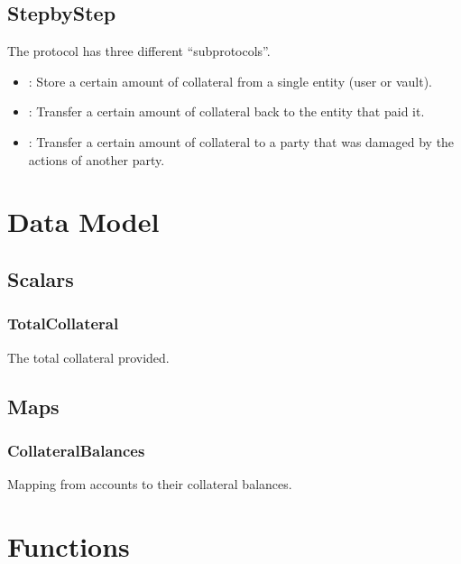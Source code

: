 \documentclass[a4paper,10pt,english]{sphinxmanual}
\begin{document}
\subsection{Step\sphinxhyphen{}by\sphinxhyphen{}Step}
\label{\detokenize{spec/collateral:step-by-step}}
The protocol has three different “sub\sphinxhyphen{}protocols”.
\begin{itemize}
\item {} 
: Store a certain amount of collateral from a single entity (user or vault).

\item {} 
: Transfer a certain amount of collateral back to the entity that paid it.

\item {} 
: Transfer a certain amount of collateral to a party that was damaged by the actions of another party.

\end{itemize}


\section{Data Model}
\label{\detokenize{spec/collateral:data-model}}

\subsection{Scalars}
\label{\detokenize{spec/collateral:scalars}}

\subsubsection{TotalCollateral}
\label{\detokenize{spec/collateral:totalcollateral}}
The total collateral provided.


\subsection{Maps}
\label{\detokenize{spec/collateral:maps}}

\subsubsection{CollateralBalances}
\label{\detokenize{spec/collateral:collateralbalances}}
Mapping from accounts to their collateral balances.


\section{Functions}
\label{\detokenize{spec/collateral:functions}}
\end{document}
